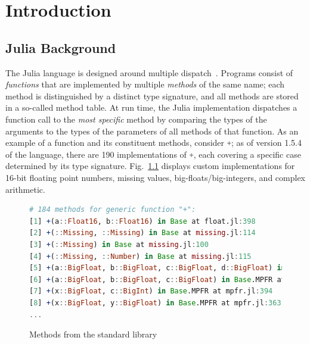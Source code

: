 \documentclass[oneside,openright,titlepage,numbers=noenddot,%
headinclude,footinclude,cleardoublepage=empty,abstract=on,
BCOR=5mm,paper=a4,fontsize=11pt,
dvipsnames
]{scrreprt}
\renewcommand{\c}[1]{\lstinline[language=Julia]!#1!\xspace}
\begin{document}
\cleardoublepage
\pagestyle{scrheadings}
\cleardoublepage



\chapter{Introduction}%
\label{chap-intro}

\section{Julia Background}%
\label{sec-julia}

The Julia language is designed around multiple dispatch~\cite{BezansonEKS17}.
Programs consist of \emph{functions} that are implemented by multiple
\emph{methods} of the same name; each method is distinguished by a distinct type
signature, and all methods are stored in a so-called method table.
At run time, the Julia implementation dispatches a function call to
the \emph{most specific} method by comparing the types of the arguments to the
types of the parameters of all methods of that function. As an example of a
function and its constituent methods, consider \c{+}; as of version 1.5.4 of the
language, there are 190 implementations of \c{+}, each covering a
specific case determined by its type signature. Fig.~\ref{plus} displays custom
implementations for 16-bit floating point numbers, missing values,
big-floats/big-integers, and complex arithmetic.

\begin{figure}
\begin{lstlisting}[language=julia]
# 184 methods for generic function "+":
[1] +(a::Float16, b::Float16) in Base at float.jl:398
[2] +(::Missing, ::Missing) in Base at missing.jl:114
[3] +(::Missing) in Base at missing.jl:100
[4] +(::Missing, ::Number) in Base at missing.jl:115
[5] +(a::BigFloat, b::BigFloat, c::BigFloat, d::BigFloat) in Base.MPFR at mpfr.jl:541
[6] +(a::BigFloat, b::BigFloat, c::BigFloat) in Base.MPFR at mpfr.jl:535
[7] +(x::BigFloat, c::BigInt) in Base.MPFR at mpfr.jl:394
[8] +(x::BigFloat, y::BigFloat) in Base.MPFR at mpfr.jl:363
...
\end{lstlisting}
\caption{Methods from the standard library}\label{plus}
\end{figure}
\end{document}

